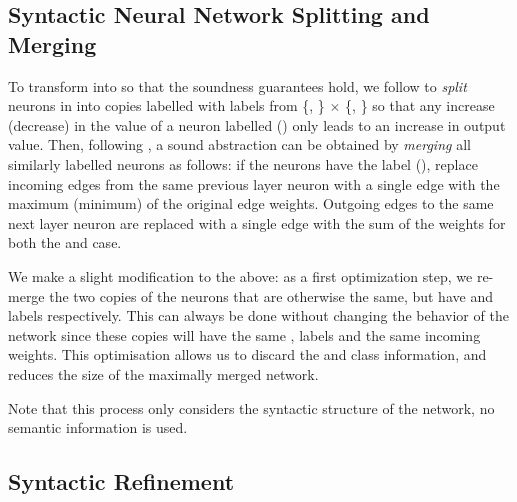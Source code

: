 \subsection{Syntactic Neural Network Splitting and Merging}
\label{s:nn-sam}



To transform \cnc into \abs so that the soundness guarantees hold, we follow
\cite{cegar-nn} to \textit{split} neurons in \cnc into copies labelled with
labels from \{\inc, \dec\} $\times$ \{\posc, \negc\} so that any
increase (decrease) in the value of a neuron labelled
\inc (\dec) only leads to an increase in output value. Then,
following \cite{cegar-nn}, a sound abstraction can be obtained by
\textit{merging} all similarly labelled neurons as follows: if the neurons have
the label \inc (\dec), replace incoming edges from the same
previous layer neuron with a single edge with the maximum (minimum) of the
original edge weights. Outgoing edges to the same next layer neuron are replaced
with a single edge with the sum of the weights for both the \inc and \dec case.


We make a slight modification to the above: as a first optimization step, we
re-merge the two copies of the \abs neurons that are otherwise the same, but
have \posc and \negc labels respectively. This can always be done without
changing the behavior of the network since these copies will have the same \inc,
\dec labels and the same incoming weights.  This optimisation
allows us to discard the \posc and \negc class information, and reduces the size
of the maximally merged network.

Note that this process only considers the syntactic structure of the network, no
semantic information is used.

\subsection{ Syntactic Refinement }

